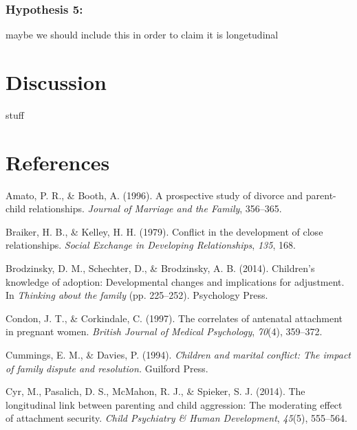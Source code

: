 \documentclass[man]{apa6}
\begin{document}
\hypertarget{hypothesis-5}{%
\subsubsection{Hypothesis 5:}\label{hypothesis-5}}

maybe we should include this in order to claim it is longetudinal

\hypertarget{discussion}{%
\section{Discussion}\label{discussion}}

stuff

\newpage

\hypertarget{references}{%
\section{References}\label{references}}

\begingroup
\setlength{\parindent}{-0.5in}
\setlength{\leftskip}{0.5in}

\hypertarget{refs}{}
\leavevmode\hypertarget{ref-amato1996prospective}{}%
Amato, P. R., \& Booth, A. (1996). A prospective study of divorce and parent-child relationships. \emph{Journal of Marriage and the Family}, 356--365.

\leavevmode\hypertarget{ref-braiker1979conflict}{}%
Braiker, H. B., \& Kelley, H. H. (1979). Conflict in the development of close relationships. \emph{Social Exchange in Developing Relationships}, \emph{135}, 168.

\leavevmode\hypertarget{ref-brodzinsky2014children}{}%
Brodzinsky, D. M., Schechter, D., \& Brodzinsky, A. B. (2014). Children's knowledge of adoption: Developmental changes and implications for adjustment. In \emph{Thinking about the family} (pp. 225--252). Psychology Press.

\leavevmode\hypertarget{ref-condon1997correlates}{}%
Condon, J. T., \& Corkindale, C. (1997). The correlates of antenatal attachment in pregnant women. \emph{British Journal of Medical Psychology}, \emph{70}(4), 359--372.

\leavevmode\hypertarget{ref-cummings1994children}{}%
Cummings, E. M., \& Davies, P. (1994). \emph{Children and marital conflict: The impact of family dispute and resolution.} Guilford Press.

\leavevmode\hypertarget{ref-study3}{}%
Cyr, M., Pasalich, D. S., McMahon, R. J., \& Spieker, S. J. (2014). The longitudinal link between parenting and child aggression: The moderating effect of attachment security. \emph{Child Psychiatry \& Human Development}, \emph{45}(5), 555--564.
\end{document}
